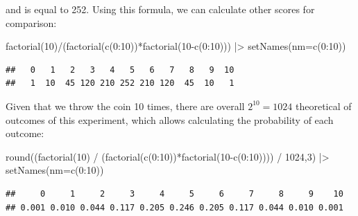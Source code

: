 \documentclass[
]{book}
\newenvironment{Shaded}{\begin{snugshade}}{\end{snugshade}}
\newcommand{\AttributeTok}[1]{\textcolor[rgb]{0.77,0.63,0.00}{#1}}
\newcommand{\DecValTok}[1]{\textcolor[rgb]{0.00,0.00,0.81}{#1}}
\newcommand{\FunctionTok}[1]{\textcolor[rgb]{0.00,0.00,0.00}{#1}}
\newcommand{\NormalTok}[1]{#1}
\newcommand{\SpecialCharTok}[1]{\textcolor[rgb]{0.00,0.00,0.00}{#1}}
\theoremstyle{definition}
\theoremstyle{definition}
\theoremstyle{definition}
\theoremstyle{definition}
\theoremstyle{remark}
\begin{document}
and is equal to 252. Using this formula, we can calculate other scores for comparison:

\begin{Shaded}
\begin{Highlighting}[]
\FunctionTok{factorial}\NormalTok{(}\DecValTok{10}\NormalTok{)}\SpecialCharTok{/}\NormalTok{(}\FunctionTok{factorial}\NormalTok{(}\FunctionTok{c}\NormalTok{(}\DecValTok{0}\SpecialCharTok{:}\DecValTok{10}\NormalTok{))}\SpecialCharTok{*}\FunctionTok{factorial}\NormalTok{(}\DecValTok{10}\SpecialCharTok{{-}}\FunctionTok{c}\NormalTok{(}\DecValTok{0}\SpecialCharTok{:}\DecValTok{10}\NormalTok{))) }\SpecialCharTok{|\textgreater{}}
    \FunctionTok{setNames}\NormalTok{(}\AttributeTok{nm=}\FunctionTok{c}\NormalTok{(}\DecValTok{0}\SpecialCharTok{:}\DecValTok{10}\NormalTok{))}
\end{Highlighting}
\end{Shaded}

\begin{verbatim}
##   0   1   2   3   4   5   6   7   8   9  10 
##   1  10  45 120 210 252 210 120  45  10   1
\end{verbatim}

Given that we throw the coin 10 times, there are overall \(2^{10}=1024\) theoretical of outcomes of this experiment, which allows calculating the probability of each outcome:

\begin{Shaded}
\begin{Highlighting}[]
\FunctionTok{round}\NormalTok{((}\FunctionTok{factorial}\NormalTok{(}\DecValTok{10}\NormalTok{) }\SpecialCharTok{/}
\NormalTok{           (}\FunctionTok{factorial}\NormalTok{(}\FunctionTok{c}\NormalTok{(}\DecValTok{0}\SpecialCharTok{:}\DecValTok{10}\NormalTok{))}\SpecialCharTok{*}\FunctionTok{factorial}\NormalTok{(}\DecValTok{10}\SpecialCharTok{{-}}\FunctionTok{c}\NormalTok{(}\DecValTok{0}\SpecialCharTok{:}\DecValTok{10}\NormalTok{)))) }\SpecialCharTok{/}
          \DecValTok{1024}\NormalTok{,}\DecValTok{3}\NormalTok{) }\SpecialCharTok{|\textgreater{}}
    \FunctionTok{setNames}\NormalTok{(}\AttributeTok{nm=}\FunctionTok{c}\NormalTok{(}\DecValTok{0}\SpecialCharTok{:}\DecValTok{10}\NormalTok{))}
\end{Highlighting}
\end{Shaded}

\begin{verbatim}
##     0     1     2     3     4     5     6     7     8     9    10 
## 0.001 0.010 0.044 0.117 0.205 0.246 0.205 0.117 0.044 0.010 0.001
\end{verbatim}
\end{document}
